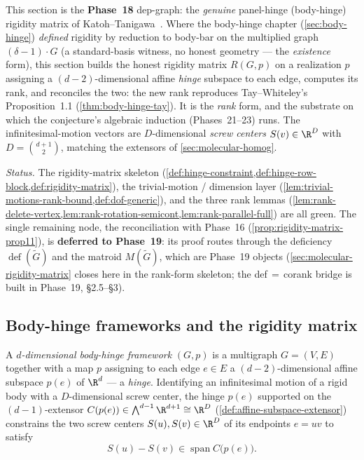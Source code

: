 This section is the \textbf{Phase~18} dep-graph: the \emph{genuine}
panel-hinge (body-hinge) rigidity matrix of
Katoh--Tanigawa~\cite[\S2.2--2.4]{katohTanigawa2011}. Where the
body-hinge chapter (\cref{sec:body-hinge}) \emph{defined} rigidity by
reduction to body-bar on the multiplied graph $(\delta-1)\cdot G$ (a
standard-basis witness, no honest geometry --- the
\emph{existence} form), this section builds the honest rigidity matrix
$R(G,p)$ on a realization $p$ assigning a $(d-2)$-dimensional affine
\emph{hinge} subspace to each edge, computes its rank, and reconciles
the two: the new rank reproduces Tay--Whiteley's Proposition~1.1
(\cref{thm:body-hinge-tay}). It is the \emph{rank} form, and the
substrate on which the conjecture's algebraic induction
(Phases~21--23) runs. The infinitesimal-motion vectors are
$D$-dimensional \emph{screw centers} $S(v) \in \R^{D}$ with
$D = \binom{d+1}{2}$, matching the extensors of
\cref{sec:molecular-homog}.

\medskip
\noindent\emph{Status.} The rigidity-matrix skeleton
(\cref{def:hinge-constraint,def:hinge-row-block,def:rigidity-matrix}),
the trivial-motion / dimension layer
(\cref{lem:trivial-motions-rank-bound,def:dof-generic}), and the three
rank lemmas
(\cref{lem:rank-delete-vertex,lem:rank-rotation-semicont,lem:rank-parallel-full})
are all green. The single remaining node, the reconciliation with
Phase~16 (\cref{prop:rigidity-matrix-prop11}), is \textbf{deferred to
Phase~19}: its proof routes through the deficiency
$\operatorname{def}(\tilde G)$ and the matroid $M(\tilde G)$, which are
Phase~19 objects (\cref{sec:molecular-rigidity-matrix} closes here in
the rank-form skeleton; the def\,$=$\,corank bridge is built in
Phase~19, \S2.5--\S3).

\subsection{Body-hinge frameworks and the rigidity matrix}
\label{sec:molecular-rigidity-matrix-def}

\begin{definition}
  \label{def:hinge-constraint}
  \leanok
  A \emph{$d$-dimensional body-hinge framework} $(G,p)$ is a multigraph
  $G = (V,E)$ together with a map $p$ assigning to each edge $e \in E$ a
  $(d-2)$-dimensional affine subspace $p(e)$ of $\R^{d}$ --- a
  \emph{hinge}. Identifying an infinitesimal motion of a rigid body with
  a $D$-dimensional screw center, the hinge $p(e)$ supported on the
  $(d-1)$-extensor $C(p(e)) \in \bigwedge^{d-1}\R^{d+1} \cong \R^{D}$
  (\cref{def:affine-subspace-extensor}) constrains the two screw centers
  $S(u), S(v) \in \R^{D}$ of its endpoints $e = uv$ to satisfy
  \[
    S(u) - S(v) \in \operatorname{span} C\bigl(p(e)\bigr).
  \]
\end{definition}


